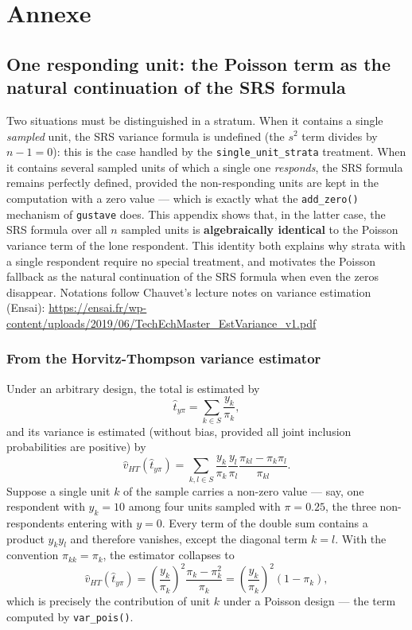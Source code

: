 \documentclass[
]{article}
\begin{document}
\section{Annexe}\label{annexe}

\subsection{One responding unit: the Poisson term as the natural
continuation of the SRS
formula}\label{one-responding-unit-the-poisson-term-as-the-natural-continuation-of-the-srs-formula}

Two situations must be distinguished in a stratum. When it contains a
single \emph{sampled} unit, the SRS variance formula is undefined (the
\(s^2\) term divides by \(n - 1 = 0\)): this is the case handled by the
\texttt{single\_unit\_strata} treatment. When it contains several
sampled units of which a single one \emph{responds}, the SRS formula
remains perfectly defined, provided the non-responding units are kept in
the computation with a zero value --- which is exactly what the
\texttt{add\_zero()} mechanism of \texttt{gustave} does. This appendix
shows that, in the latter case, the SRS formula over all \(n\) sampled
units is \textbf{algebraically identical} to the Poisson variance term
of the lone respondent. This identity both explains why strata with a
single respondent require no special treatment, and motivates the
Poisson fallback as the natural continuation of the SRS formula when
even the zeros disappear. Notations follow Chauvet's lecture notes on
variance estimation (Ensai):
\url{https://ensai.fr/wp-content/uploads/2019/06/TechEchMaster_EstVariance_v1.pdf}

\subsubsection{From the Horvitz-Thompson variance
estimator}\label{from-the-horvitz-thompson-variance-estimator}

Under an arbitrary design, the total is estimated by \[
\hat t_{y\pi} = \sum_{k \in S} \frac{y_k}{\pi_k},
\] and its variance is estimated (without bias, provided all joint
inclusion probabilities are positive) by \[
\hat v_{HT}(\hat t_{y\pi}) = \sum_{k,l \in S}
\frac{y_k}{\pi_k} \frac{y_l}{\pi_l}
\frac{\pi_{kl} - \pi_k \pi_l}{\pi_{kl}}.
\] Suppose a single unit \(k\) of the sample carries a non-zero value
--- say, one respondent with \(y_k = 10\) among four units sampled with
\(\pi = 0.25\), the three non-respondents entering with \(y = 0\). Every
term of the double sum contains a product \(y_k y_l\) and therefore
vanishes, except the diagonal term \(k = l\). With the convention
\(\pi_{kk} = \pi_k\), the estimator collapses to \[
\hat v_{HT}(\hat t_{y\pi})
= \left(\frac{y_k}{\pi_k}\right)^2 \frac{\pi_k - \pi_k^2}{\pi_k}
= \left(\frac{y_k}{\pi_k}\right)^2 (1 - \pi_k),
\] which is precisely the contribution of unit \(k\) under a Poisson
design --- the term computed by \texttt{var\_pois()}.
\end{document}
